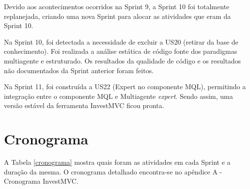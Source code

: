 Devido aos acontecimentos ocorridos na Sprint 9, a Sprint 10 foi totalmente replanejada, criando uma nova Sprint para alocar as atividades que eram da Sprint 10.

Na Sprint 10, foi detectada a necessidade de excluir a US20 (retirar da base de conhecimento). Foi realizada a análise estática de código fonte dos paradigmas multiagente e estruturado. Os resultados da qualidade de código e os resultados não documentados da Sprint anterior foram feitos.

Na Sprint 11, foi construída a US22 (Expert no componente MQL), permitindo a integração entre o componente MQL e Multiagente \textit{expert}. Sendo assim, uma versão estável da ferramenta InvestMVC ficou pronta.

\section{Cronograma}

A Tabela \ref{cronograma} mostra quais foram as atividades em cada Sprint e a duração da mesma. O cronograma detalhado encontra-se no apêndice A - Cronograma InvestMVC.

